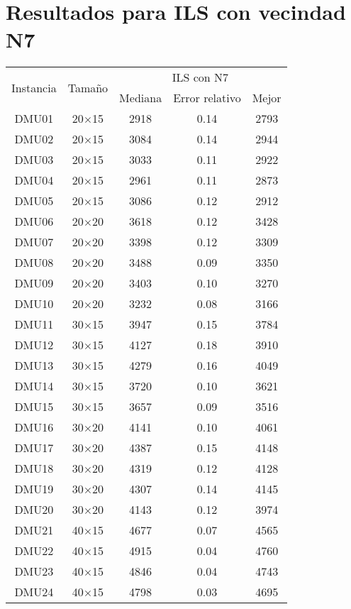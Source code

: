 \section{Resultados para ILS con vecindad N7}
\begin{table}[H]
\centering
\begin{tabular}{@{}ccccc@{}}
\toprule
\multirow{2}{*}{Instancia} & \multirow{2}{*}{Tamaño} & \multicolumn{3}{c}{ILS con N7} \\ \cmidrule(lr){3-5}
& & Mediana& Error relativo & Mejor  \\ \midrule
DMU01 & 20$\times$15 & 2918 & 0.14 & 2793\\ 
DMU02 & 20$\times$15 & 3084 & 0.14 & 2944\\ 
DMU03 & 20$\times$15 & 3033 & 0.11 & 2922\\ 
DMU04 & 20$\times$15 & 2961 & 0.11 & 2873\\ 
DMU05 & 20$\times$15 & 3086 & 0.12 & 2912\\ 
DMU06 & 20$\times$20 & 3618 & 0.12 & 3428\\ 
DMU07 & 20$\times$20 & 3398 & 0.12 & 3309\\ 
DMU08 & 20$\times$20 & 3488 & 0.09 & 3350\\ 
DMU09 & 20$\times$20 & 3403 & 0.10 & 3270\\ 
DMU10 & 20$\times$20 & 3232 & 0.08 & 3166\\ 
DMU11 & 30$\times$15 & 3947 & 0.15 & 3784\\ 
DMU12 & 30$\times$15 & 4127 & 0.18 & 3910\\ 
DMU13 & 30$\times$15 & 4279 & 0.16 & 4049\\ 
DMU14 & 30$\times$15 & 3720 & 0.10 & 3621\\ 
DMU15 & 30$\times$15 & 3657 & 0.09 & 3516\\ 
DMU16 & 30$\times$20 & 4141 & 0.10 & 4061\\ 
DMU17 & 30$\times$20 & 4387 & 0.15 & 4148\\ 
DMU18 & 30$\times$20 & 4319 & 0.12 & 4128\\ 
DMU19 & 30$\times$20 & 4307 & 0.14 & 4145\\ 
DMU20 & 30$\times$20 & 4143 & 0.12 & 3974\\ 
DMU21 & 40$\times$15 & 4677 & 0.07 & 4565\\ 
DMU22 & 40$\times$15 & 4915 & 0.04 & 4760\\ 
DMU23 & 40$\times$15 & 4846 & 0.04 & 4743\\ 
DMU24 & 40$\times$15 & 4798 & 0.03 & 4695\\ 

\end{tabular}
\end{table}
